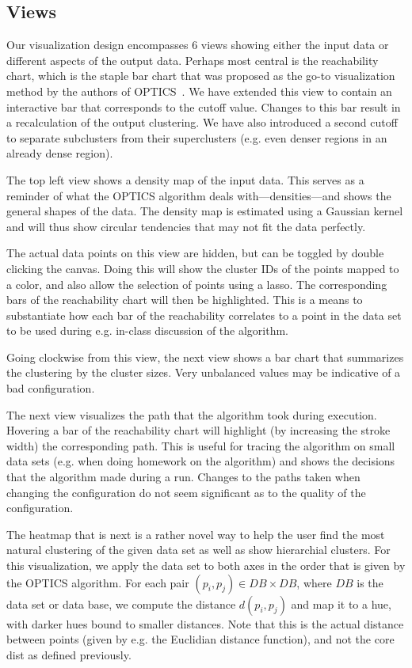 \documentclass{vgtc}                          %
\begin{document}
\subsection{Views}

Our visualization design encompasses 6 views showing either the input data or
different aspects of the output data. Perhaps most central is the reachability
chart, which is the staple bar chart that was proposed as the go-to
visualization method by the authors of OPTICS~\cite{optics}. We have extended
this view to contain an interactive bar that corresponds to the cutoff value.
Changes to this bar result in a recalculation of the output clustering. We have
also introduced a second cutoff to separate subclusters from their
superclusters (e.g. even denser regions in an already dense region).

The top left view shows a density map of the input data. This serves as a reminder
of what the OPTICS algorithm deals with---densities---and shows the general shapes of
the data. The density map is estimated using a Gaussian kernel and will thus show
circular tendencies that may not fit the data perfectly.

The actual data points on this view are hidden, but can be toggled by double clicking
the canvas. Doing this will show the cluster IDs of the points mapped to a color, and
also allow the selection of points using a lasso. The corresponding bars of the reachability
chart will then be highlighted. This is a means to substantiate how each bar of the
reachability correlates to a point in the data set to be used during e.g. in-class
discussion of the algorithm.

Going clockwise from this view, the next view shows a bar chart that summarizes the
clustering by the cluster sizes. Very unbalanced values may be indicative of a bad
configuration.

The next view visualizes the path that the algorithm took during execution.
Hovering a bar of the reachability chart will highlight (by increasing the
stroke width) the corresponding path. This is useful for tracing the algorithm
on small data sets (e.g. when doing homework on the algorithm) and shows the
decisions that the algorithm made during a run. Changes to the paths taken when
changing the configuration do not seem significant as to the quality of the
configuration.

The heatmap that is next is a rather novel way to help the user find the most
natural clustering of the given data set as well as show hierarchial clusters.
For this visualization, we apply the data set to both axes in the order that is
given by the OPTICS algorithm. For each pair $(p_i, p_j) \in DB \times
DB$, where $DB$ is the data set or data base, we compute the distance
$d(p_i, p_j)$ and map it to a hue, with darker hues bound to smaller distances.
Note that this is the actual distance between points (given by e.g. the
Euclidian distance function), and not the core dist as defined previously.
\end{document}

